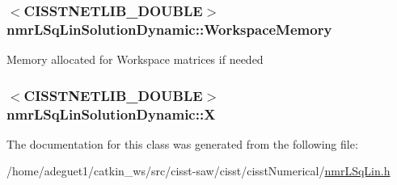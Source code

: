 \hypertarget{classnmr_l_sq_lin_solution_dynamic_afa790c8ff0361dfe31522d1287cc03c2}{
\subsubsection[{Workspace\-Memory}]{$<$C\-I\-S\-S\-T\-N\-E\-T\-L\-I\-B\-\_\-\-D\-O\-U\-B\-L\-E$>$ nmr\-L\-Sq\-Lin\-Solution\-Dynamic\-::\-Workspace\-Memory\hspace{0.3cm}{\ttfamily [protected]}}}\label{classnmr_l_sq_lin_solution_dynamic_afa790c8ff0361dfe31522d1287cc03c2}
Memory allocated for Workspace matrices if needed \hypertarget{classnmr_l_sq_lin_solution_dynamic_a170954053506de199dd1636a50107538}{
\subsubsection[{X}]{$<$C\-I\-S\-S\-T\-N\-E\-T\-L\-I\-B\-\_\-\-D\-O\-U\-B\-L\-E$>$ nmr\-L\-Sq\-Lin\-Solution\-Dynamic\-::\-X\hspace{0.3cm}{\ttfamily [protected]}}}\label{classnmr_l_sq_lin_solution_dynamic_a170954053506de199dd1636a50107538}


The documentation for this class was generated from the following file\-:\begin{DoxyCompactItemize}
\item 
/home/adeguet1/catkin\-\_\-ws/src/cisst-\/saw/cisst/cisst\-Numerical/\hyperlink{nmr_l_sq_lin_8h}{nmr\-L\-Sq\-Lin.\-h}\end{DoxyCompactItemize}
